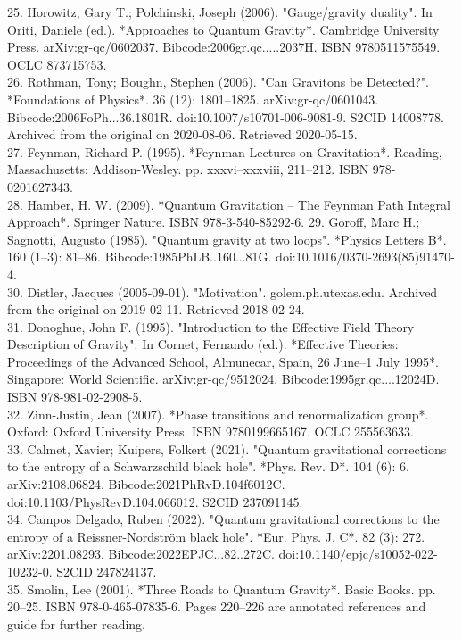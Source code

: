 25. Horowitz, Gary T.; Polchinski, Joseph (2006). "Gauge/gravity duality". In Oriti, Daniele (ed.). *Approaches to Quantum Gravity*. Cambridge University Press. arXiv:gr-qc/0602037. Bibcode:2006gr.qc.....2037H. ISBN 9780511575549. OCLC 873715753.\\
26. Rothman, Tony; Boughn, Stephen (2006). "Can Gravitons be Detected?". *Foundations of Physics*. 36 (12): 1801–1825. arXiv:gr-qc/0601043. Bibcode:2006FoPh...36.1801R. doi:10.1007/s10701-006-9081-9. S2CID 14008778. Archived from the original on 2020-08-06. Retrieved 2020-05-15.\\
27. Feynman, Richard P. (1995). *Feynman Lectures on Gravitation*. Reading, Massachusetts: Addison-Wesley. pp. xxxvi–xxxviii, 211–212. ISBN 978-0201627343.\\
28. Hamber, H. W. (2009). *Quantum Gravitation – The Feynman Path Integral Approach*. Springer Nature. ISBN 978-3-540-85292-6.  
29. Goroff, Marc H.; Sagnotti, Augusto (1985). "Quantum gravity at two loops". *Physics Letters B*. 160 (1–3): 81–86. Bibcode:1985PhLB..160...81G. doi:10.1016/0370-2693(85)91470-4.\\
30. Distler, Jacques (2005-09-01). "Motivation". golem.ph.utexas.edu. Archived from the original on 2019-02-11. Retrieved 2018-02-24.\\
31. Donoghue, John F. (1995). "Introduction to the Effective Field Theory Description of Gravity". In Cornet, Fernando (ed.). *Effective Theories: Proceedings of the Advanced School, Almunecar, Spain, 26 June–1 July 1995*. Singapore: World Scientific. arXiv:gr-qc/9512024. Bibcode:1995gr.qc....12024D. ISBN 978-981-02-2908-5.\\
32. Zinn-Justin, Jean (2007). *Phase transitions and renormalization group*. Oxford: Oxford University Press. ISBN 9780199665167. OCLC 255563633.\\
33. Calmet, Xavier; Kuipers, Folkert (2021). "Quantum gravitational corrections to the entropy of a Schwarzschild black hole". *Phys. Rev. D*. 104 (6): 6. arXiv:2108.06824. Bibcode:2021PhRvD.104f6012C. doi:10.1103/PhysRevD.104.066012. S2CID 237091145.\\
34. Campos Delgado, Ruben (2022). "Quantum gravitational corrections to the entropy of a Reissner-Nordström black hole". *Eur. Phys. J. C*. 82 (3): 272. arXiv:2201.08293. Bibcode:2022EPJC...82..272C. doi:10.1140/epjc/s10052-022-10232-0. S2CID 247824137.\\
35. Smolin, Lee (2001). *Three Roads to Quantum Gravity*. Basic Books. pp. 20–25. ISBN 978-0-465-07835-6. Pages 220–226 are annotated references and guide for further reading.\\
